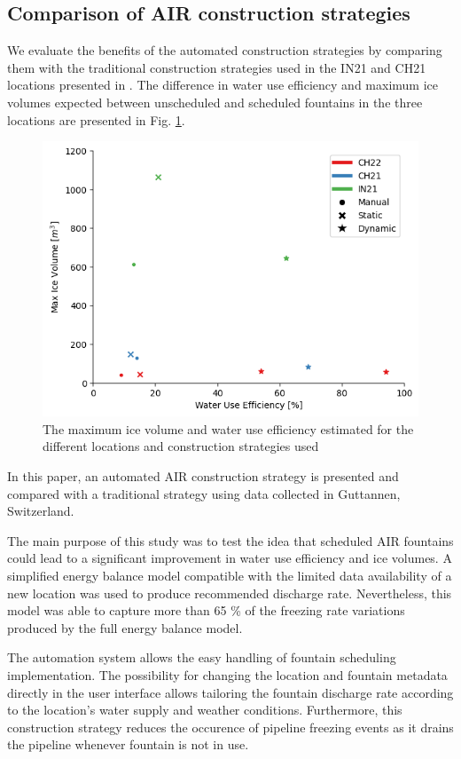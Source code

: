 \documentclass[tc, manuscript]{copernicus}
\begin{document}
\subsection{Comparison of AIR construction strategies}
We evaluate the benefits of the automated construction strategies by comparing them with the traditional
construction strategies used in the IN21 and CH21 locations presented in
\cite{balasubramanianInfluenceMeteorologicalConditions2022}. The difference in water use efficiency and maximum
ice volumes expected between unscheduled and scheduled fountains in the three locations are presented in Fig.
\ref{fig:wue}.

\begin{figure}[t]
\includegraphics[width=12cm]{Figures/wue.png}
\caption{The maximum ice volume and water use efficiency estimated for the different locations and construction
strategies used} 
\label{fig:wue} 
\end{figure}


\conclusions
In this paper, an automated AIR construction strategy is presented and compared with a traditional strategy
using data collected in Guttannen, Switzerland.

The main purpose of this study was to test the idea that scheduled AIR fountains could lead to a significant
improvement in water use efficiency and ice volumes. A simplified energy balance model compatible with the
limited data availability of a new location was used to produce recommended discharge rate. Nevertheless, this
model was able to capture more than 65 \% of the freezing rate variations produced by the full energy balance
model.

The automation system allows the easy handling of fountain scheduling implementation. The possibility for
changing the location and fountain metadata directly in the user interface allows tailoring the fountain discharge rate
according to the location's water supply and weather conditions. Furthermore, this construction strategy reduces
the occurence of pipeline freezing events as it drains the pipeline whenever fountain is not in use.
\end{document}
